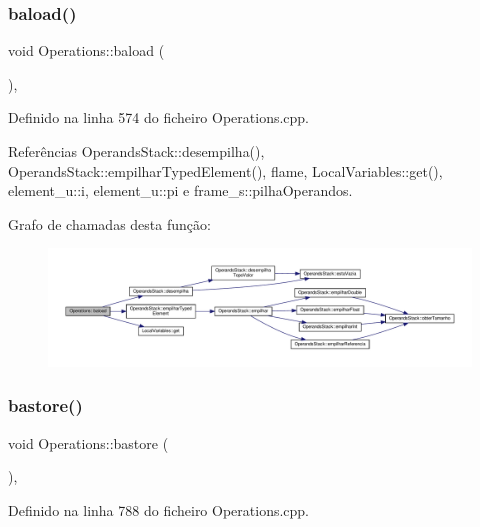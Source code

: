 \subsubsection{\texorpdfstring{baload()}{baload()}}
{\footnotesize\ttfamily void Operations\+::baload (\begin{DoxyParamCaption}{ }\end{DoxyParamCaption})\hspace{0.3cm}{\ttfamily [static]}, {\ttfamily [private]}}



Definido na linha 574 do ficheiro Operations.\+cpp.



Referências Operands\+Stack\+::desempilha(), Operands\+Stack\+::empilhar\+Typed\+Element(), flame, Local\+Variables\+::get(), element\+\_\+u\+::i, element\+\_\+u\+::pi e frame\+\_\+s\+::pilha\+Operandos.

Grafo de chamadas desta função\+:
\nopagebreak
\begin{figure}[H]
\begin{center}
\leavevmode
\includegraphics[width=350pt]{classOperations_afdf1759637e332569a2b2b17067e05f0_cgraph}
\end{center}
\end{figure}
\mbox{\label{classOperations_a6f0ded6d2fc9921a1418387527bec8f4}} 
\subsubsection{\texorpdfstring{bastore()}{bastore()}}
{\footnotesize\ttfamily void Operations\+::bastore (\begin{DoxyParamCaption}{ }\end{DoxyParamCaption})\hspace{0.3cm}{\ttfamily [static]}, {\ttfamily [private]}}



Definido na linha 788 do ficheiro Operations.\+cpp.



